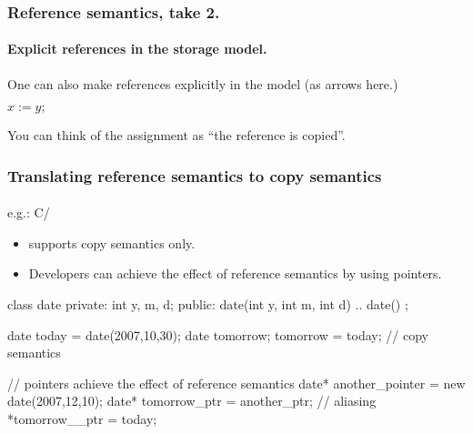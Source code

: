 \documentclass{beamer}
\begin{document}
\begin{frame}
\frametitle{Reference semantics, take 2.}
\framesubtitle{Explicit references in the storage model.}

One can also make references explicitly in the model (as arrows here.)

{\small 
{}
}
$x := y;$
{\small 
{}
}

You can think of the assignment as ``the reference is copied''.

\end{frame}




\begin{frame}[fragile]
\frametitle{Translating reference semantics to copy semantics}
\framesubtitle{}
e.g.: C/\Cpp 
\begin{itemize}
\item \Cpp supports copy semantics only. 
\item Developers can achieve the
effect of reference semantics by using pointers. 
\end{itemize}

\begin{cplus}
class date {
private:
    int y, m, d;
public:
    date(int y, int m, int d) {..}
    date() {}
};

date today = date(2007,10,30);
date tomorrow; 
tomorrow = today;  // copy semantics

// pointers achieve the effect of reference semantics
date* another_pointer = new date(2007,12,10);
date* tomorrow_ptr    = another_ptr;   // aliasing
*tomorrow__ptr = today;
\end{cplus}


\end{frame}
\end{document}
